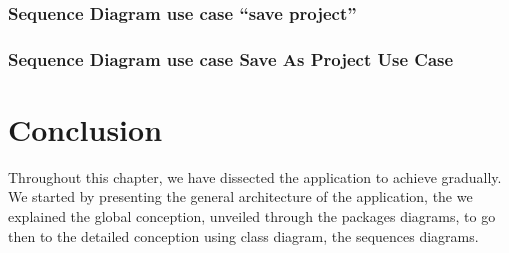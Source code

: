 	\clearpage
    \newpage 
	\subsubsection{Sequence Diagram use case ``save project''}	
	
	
    \pagebreak

	\clearpage
	\newpage
	\subsubsection{Sequence Diagram use case Save As Project Use Case}


    \pagebreak
	\clearpage
	\newpage
	\section{Conclusion}
	Throughout this chapter, we have dissected the application to achieve gradually.
	We started by presenting the general architecture of the application, the we explained the global conception, unveiled through the packages diagrams, to go then to the detailed conception using class diagram, the sequences diagrams.  
	
